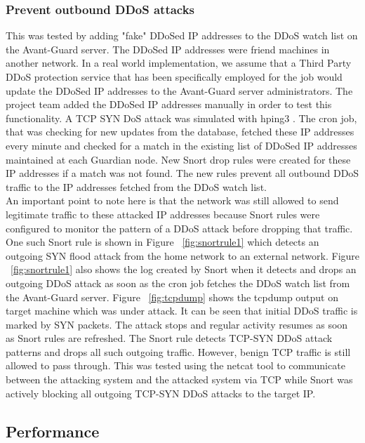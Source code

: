 \subsubsection{Prevent outbound DDoS attacks}
\label{sec:eval:outddos}

This was tested by adding "fake" DDoSed IP addresses to the DDoS watch list on the Avant-Guard server. The DDoSed IP addresses were friend machines in another network. In a real world implementation, we assume that a Third Party DDoS protection service \cite{DDoSPreventionTools} that has been specifically employed for the job would update the DDoSed IP addresses to the Avant-Guard server administrators. The project team added the DDoSed IP addresses manually in order to test this functionality. A TCP SYN DoS attack was simulated with hping3 \cite{hpingReferralPaper} \cite{hping}.  The cron job, that was checking for new updates from the database, fetched these IP addresses every minute and checked for a match in the existing list of DDoSed IP addresses maintained at each Guardian node. New Snort drop rules were created for these IP addresses if a match was not found. The new rules prevent all outbound DDoS traffic to the IP addresses fetched from the DDoS watch list. \\

An important point to note here is that the network was still allowed to send legitimate traffic to these attacked IP addresses because Snort rules were configured to monitor the pattern of a DDoS attack before dropping that traffic. One such Snort rule is shown in Figure ~\ref{fig:snortrule1} which detects an outgoing SYN flood attack from the home network to an external network. Figure ~\ref{fig:snortrule1} also shows the log created by Snort when it detects and drops an outgoing DDoS attack as soon as the cron job fetches the DDoS watch list from the Avant-Guard server. Figure ~\ref{fig:tcpdump} shows the tcpdump output on target machine which was under attack. It can be seen that initial DDoS traffic is marked by SYN packets. The attack stops and regular activity resumes as soon as Snort rules are refreshed. The Snort rule detects TCP-SYN DDoS attack patterns and drops all such outgoing traffic. However, benign TCP traffic is still allowed to pass through. This was tested using the netcat tool \cite{netcat} to communicate between the attacking system and the attacked system via TCP while Snort was actively blocking all outgoing TCP-SYN DDoS attacks to the target IP.

\subsection{Performance}

